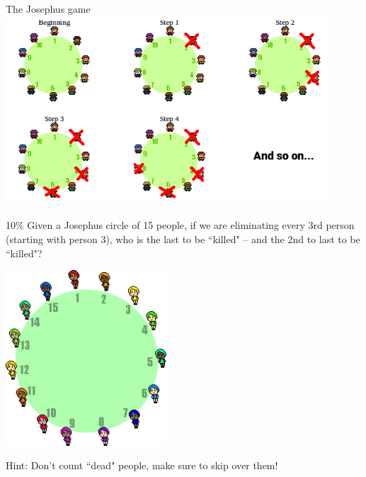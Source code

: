\documentclass[a4paper,12pt]{book}
\begin{document}
\begin{intro}{The Josephus game}
            \includegraphics[width=12cm]{images/josephus.png}
        \end{intro}

        \newpage
        \begin{question}{4}{10\%}
            Given a Josephus circle of 15 people,
            if we are eliminating every 3rd person (starting with person 3),
            who is the last to be ``killed" – and the 2nd to last to be ``killed"?

            \begin{center}
                \includegraphics[width=6cm]{images/josephus-15.png}
            \end{center}

            \begin{hint}{Hint:}
                Don't count ``dead" people, make sure to skip over them!
            \end{hint}
            
        \end{question}
\end{document}
